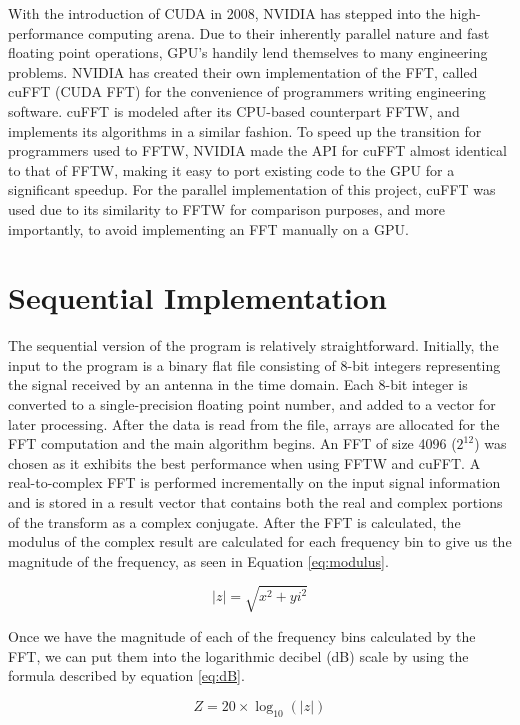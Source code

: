 \documentclass[conference]{IEEEtran}
\begin{document}
With the introduction of CUDA in 2008, NVIDIA has stepped into the
high-performance computing arena. Due to their inherently parallel
nature and fast floating point operations, GPU's handily lend themselves 
to many engineering problems. NVIDIA has created their own implementation
of the FFT, called cuFFT (CUDA FFT) for the convenience of programmers
writing engineering software. cuFFT is modeled after its CPU-based counterpart
FFTW, and implements its algorithms in a similar fashion. To speed up
the transition for programmers used to FFTW, NVIDIA made the API for
cuFFT almost identical to that of FFTW, making it easy to port existing
code to the GPU for a significant speedup. For the parallel implementation
of this project, cuFFT was used due to its similarity to FFTW for comparison
purposes, and more importantly,  to avoid implementing an FFT manually
on a GPU. 

\section{Sequential Implementation}

The sequential version of the program is relatively straightforward. Initially,
the input to the program is a binary flat file consisting of 8-bit integers 
representing the signal received by an antenna in the time domain. Each 8-bit
integer is converted to a single-precision floating point number, and added
to a vector for later processing. After the data is read from the file, arrays
are allocated for the FFT computation and the main algorithm begins. An FFT of size
4096 ($2^{12}$) was chosen as it exhibits the best performance when using FFTW and cuFFT.
A real-to-complex FFT is performed incrementally on the input signal information
and is stored in a result vector that contains both the real and complex portions
of the transform as a complex conjugate. After the FFT is calculated, the modulus 
of the complex result are calculated for each frequency bin to give us the
magnitude of the frequency, as seen in Equation \ref{eq:modulus}.

\begin{equation}
|z|=\sqrt{ x^2 + yi^2 } \label{eq:modulus}
\end{equation}

Once we have the magnitude of each of the frequency bins calculated by the FFT,
we can put them into the logarithmic decibel (dB) scale by using the formula 
described by equation \ref{eq:dB}.

\begin{equation}
Z=20 \times \log_{10}(|z|) \label{eq:dB}
\end{equation}
\end{document}

